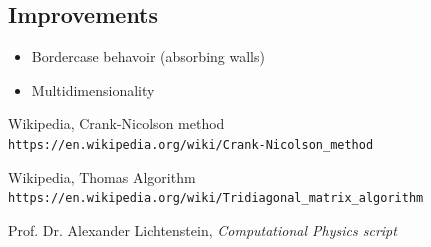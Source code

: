 \documentclass[11pt]{article}
\theoremstyle{definition}
\begin{document}
\subsection{Improvements}
\begin{itemize}
    \item Bordercase behavoir (absorbing walls)
    \item Multidimensionality
\end{itemize}
\newpage

\begin{thebibliography}{9}
Wikipedia, Crank-Nicolson method
\\\texttt{https://en.wikipedia.org/wiki/Crank-Nicolson\_method}

Wikipedia, Thomas Algorithm
\\\texttt{https://en.wikipedia.org/wiki/Tridiagonal\_matrix\_algorithm}

Prof. Dr. Alexander Lichtenstein, \textit{Computational Physics script}
\end{thebibliography}
\end{document}
